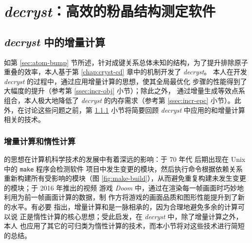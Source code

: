 
\chapter{\emph{decryst}：高效的粉晶结构测定软件}\label{chap:decr-theory}
\section{\emph{decryst} 中的增量计算}\label{sec:decr-incr}

如第 \ref{sec:atom-bump} 节所述，针对成键关系总体未知的结构，为了提升排除原子
重叠的效率，本人基于第 \ref{chap:cryst-cd} 章中的机制开发了 \emph{decryst}。
本人在开发 \emph{decryst} 的过程中，通过应用增量计算的思想，使其全局最优化
步骤的性能得到了大幅度的提升（参考第 \ref{ssec:incr-obj} 小节）；除此之外，
通过增量生成等效点系组合，本人极大地降低了 \emph{decryst} 的内存需求（参考第
\ref{ssec:incr-epc} 小节）。此外，在讨论这些问题之前，第 \ref{ssec:incr-intro}
小节将简要回顾 \emph{decryst} 中应用的和增量计算相关的技术。

\subsection{增量计算和惰性计算}\label{ssec:incr-intro}

的思想在计算机科学技术的发展中有着深远的影响：于 70 年代
后期出现在 Unix 中的 \verb|make| 程序\parencite{feldman1979}会检测软件
项目中发生变更的模块，然后执行命令根据依赖关系重新构建所有受影响的模块（图
\ref{fig:make-build}），从而避免重复构建未发生变更的模块；于 2016 年推出的视频
游戏 \emph{Doom} 中，通过在渲染每一帧画面时巧妙地利用为前一帧画面计算的数据，制
作方将游戏的画面品质和图形性能提升到了新的水平\parencite{correges2016}。有必要
指出，增量计算和是一脉相承的，因为合理地避免多余的计算可以说
正是惰性计算的核心思想；受此启发，在 \emph{decryst} 中，除了增量计算之外，本人
也应用了其它的可归类为惰性计算的技术，而本小节将对这些技术进行简短的总结。

\begin{figure}[htbp!]\bfcmd
{}
\end{figure}

